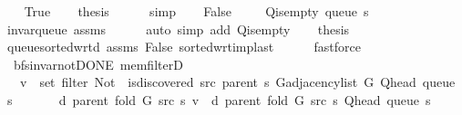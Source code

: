 \begin{isabellebody}
\ \ \isamarkupfalse%
\ True\isanewline
\ \ \isamarkupfalse%
\ {\isacharquery}{\kern0pt}thesis\isanewline
\ \ \ \ \isamarkupfalse%
\ simp\isanewline
{}\isamarkupfalse%
\isanewline
\ \ \isamarkupfalse%
\ False\isanewline
\ \ \isamarkupfalse%
\ {\isachardoublequoteopen}{\isasymnot}\ Q{\isacharunderscore}{\kern0pt}is{\isacharunderscore}{\kern0pt}empty\ {\isacharparenleft}{\kern0pt}queue\ s{\isacharparenright}{\kern0pt}{\isachardoublequoteclose}\isanewline
\ \ \ \ \isamarkupfalse%
\ invar{\isacharunderscore}{\kern0pt}queue\ assms\isanewline
\ \ \ \ \isamarkupfalse%
\ {\isacharparenleft}{\kern0pt}auto\ simp\ add{\isacharcolon}{\kern0pt}\ Q{\isachardot}{\kern0pt}is{\isacharunderscore}{\kern0pt}empty{\isacharparenright}{\kern0pt}\isanewline
\ \ \isamarkupfalse%
\ {\isacharquery}{\kern0pt}thesis\isanewline
\ \ \ \ \isamarkupfalse%
\ queue{\isacharunderscore}{\kern0pt}sorted{\isacharunderscore}{\kern0pt}wrt{\isacharunderscore}{\kern0pt}d\ assms\ False\ sorted{\isacharunderscore}{\kern0pt}wrt{\isacharunderscore}{\kern0pt}imp{\isacharunderscore}{\kern0pt}last\isanewline
\ \ \ \ \isamarkupfalse%
\ fastforce\isanewline
{}\isamarkupfalse%
%
\endisatagproof
{\isafoldproof}%
%
\isadelimproof
\isanewline
%
\endisadelimproof
%
\isadeliminvisible
\isanewline
%
\endisadeliminvisible
%
\isataginvisible
{}\isamarkupfalse%
\ {\isacharparenleft}{\kern0pt}\ bfs{\isacharunderscore}{\kern0pt}invar{\isacharunderscore}{\kern0pt}not{\isacharunderscore}{\kern0pt}DONE{\isacharparenright}{\kern0pt}\ mem{\isacharunderscore}{\kern0pt}filterD{\isacharcolon}{\kern0pt}\isanewline
\ \ \ {\isachardoublequoteopen}v\ {\isasymin}\ set\ {\isacharparenleft}{\kern0pt}filter\ {\isacharparenleft}{\kern0pt}Not\ {\isasymcirc}\ is{\isacharunderscore}{\kern0pt}discovered\ src\ {\isacharparenleft}{\kern0pt}parent\ s{\isacharparenright}{\kern0pt}{\isacharparenright}{\kern0pt}\ {\isacharparenleft}{\kern0pt}G{\isachardot}{\kern0pt}adjacency{\isacharunderscore}{\kern0pt}list\ G\ {\isacharparenleft}{\kern0pt}Q{\isacharunderscore}{\kern0pt}head\ {\isacharparenleft}{\kern0pt}queue\ s{\isacharparenright}{\kern0pt}{\isacharparenright}{\kern0pt}{\isacharparenright}{\kern0pt}{\isacharparenright}{\kern0pt}{\isachardoublequoteclose}\isanewline
\ \ \isanewline
\ \ \ \ {\isachardoublequoteopen}d\ {\isacharparenleft}{\kern0pt}parent\ {\isacharparenleft}{\kern0pt}fold\ G\ src\ s{\isacharparenright}{\kern0pt}{\isacharparenright}{\kern0pt}\ v\ {\isacharequal}{\kern0pt}\ d\ {\isacharparenleft}{\kern0pt}parent\ {\isacharparenleft}{\kern0pt}fold\ G\ src\ s{\isacharparenright}{\kern0pt}{\isacharparenright}{\kern0pt}\ {\isacharparenleft}{\kern0pt}Q{\isacharunderscore}{\kern0pt}head\ {\isacharparenleft}{\kern0pt}queue\ s{\isacharparenright}{\kern0pt}{\isacharparenright}{\kern0pt}\ {\isacharplus}{\kern0pt}\ {}{\isachardoublequoteclose}\isanewline

\end{isabellebody}
